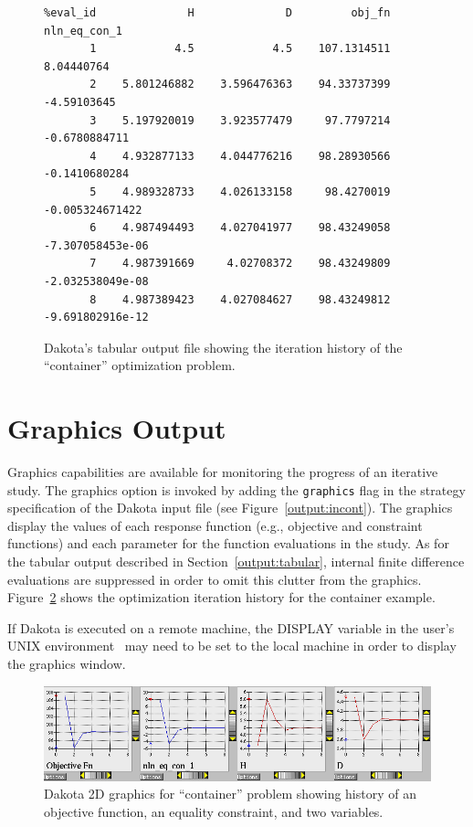 \begin{figure}
\begin{bigbox}
\begin{small}
\begin{verbatim}
%eval_id              H              D         obj_fn   nln_eq_con_1 
       1            4.5            4.5    107.1314511     8.04440764 
       2    5.801246882    3.596476363    94.33737399    -4.59103645 
       3    5.197920019    3.923577479     97.7797214  -0.6780884711 
       4    4.932877133    4.044776216    98.28930566  -0.1410680284 
       5    4.989328733    4.026133158     98.4270019 -0.005324671422 
       6    4.987494493    4.027041977    98.43249058 -7.307058453e-06 
       7    4.987391669     4.02708372    98.43249809 -2.032538049e-08 
       8    4.987389423    4.027084627    98.43249812 -9.691802916e-12 
\end{verbatim}
\end{small}
\end{bigbox}
\caption{Dakota's tabular output file showing the iteration history of
the ``container'' optimization problem.} \label{output:tabcont}
\end{figure}

\section{Graphics Output}\label{output:graphics}

Graphics capabilities are available for monitoring the progress of an
iterative study. The graphics option is invoked by adding the
\texttt{graphics} flag in the strategy specification of the Dakota
input file (see Figure~\ref{output:incont}). The graphics display
the values of each response function (e.g., objective and constraint
functions) and each parameter for the function evaluations in the
study. As for the tabular output described in
Section~\ref{output:tabular}, internal finite difference evaluations
are suppressed in order to omit this clutter from the graphics.
Figure~\ref{output:2dcont} shows the optimization iteration history
for the container example.

If Dakota is executed on a remote machine, the DISPLAY variable in the
user's UNIX environment~\cite{Gil92} may need to be set to the local
machine in order to display the graphics window. 

\begin{figure}
\centering
\includegraphics[width=\textwidth]{images/container_graphic}
\caption{Dakota 2D graphics for ``container'' problem showing history of
an objective function, an equality constraint, and two variables.}
\label{output:2dcont}
\end{figure}


